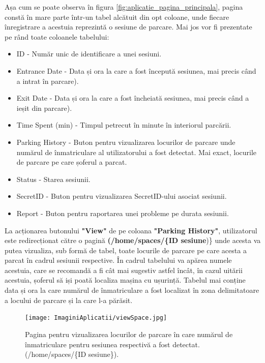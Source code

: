 \documentclass[12pt]{article}
\begin{document}
Așa cum se poate observa \^{i}n figura \ref{fig:aplicatie_pagina_principala}, pagina const\u{a} \^{i}n mare parte \^{i}ntr-un tabel alc\u{a}tuit din opt coloane, unde fiecare \^{i}nregistrare a acestuia reprezint\u{a} o sesiune de parcare. Mai jos vor fi prezentate pe r\^{a}nd toate coloanele tabelului:

\begin{itemize}
    \item ID - Num\u{a}r unic de identificare a unei sesiuni.
    \item Entrance Date - Data și ora la care a fost \^{i}nceput\u{a} sesiunea, mai precis c\^{a}nd a intrat \^{i}n parcare).
    \item Exit Date - Data și ora la care a fost \^{i}ncheiat\u{a} sesiunea, mai precis c\^{a}nd a ieșit din parcare).
    \item Time Spent (min) - Timpul petrecut \^{i}n minute \^{i}n interiorul parc\u{a}rii.
    \item Parking History - Buton pentru vizualizarea locurilor de parcare unde num\u{a}rul de \^{i}nmatriculare al utilizatorului a fost detectat. Mai exact, locurile de parcare pe care șoferul a parcat.
    \item Status - Starea sesiunii.
    \item SecretID - Buton pentru vizualizarea SecretID-ului asociat sesiunii.
    \item Report - Buton pentru raportarea unei probleme pe durata sesiunii.
\end{itemize}

La acționarea butonului \textbf{"View"} de pe coloana \textbf{"Parking History"}, utilizatorul este redirecționat c\u{a}tre o pagin\u{a} \textbf{(/home/spaces/\{ID sesiune})\} unde acesta va putea vizualiza, sub form\u{a} de tabel, toate locurile de parcare pe care acesta a parcat \^{i}n cadrul sesiunii respective. \^{I}n cadrul tabelului va ap\u{a}rea numele acestuia, care se recomand\u{a} a fi c\^{a}t mai sugestiv astfel \^{i}nc\^{a}t, \^{i}n cazul uit\u{a}rii acestuia, șoferul s\u{a} iși poat\u{a} localiza mașina cu ușurinț\u{a}. Tabelul mai conține data și ora la care num\u{a}rul de \^{i}nmatriculare a fost localizat \^{i}n zona delimitatoare a locului de parcare și la care l-a p\u{a}r\u{a}sit. 

\begin{figure}[H]
  \centering
  \texttt{[image: ImaginiAplicatii/viewSpace.jpg]}
  \caption{Pagina pentru vizualizarea locurilor de parcare \^{i}n care num\u{a}rul de \^{i}nmatriculare pentru sesiunea respectiv\u{a} a fost detectat. (/home/spaces/\{ID sesiune\}).}
  \label{fig:aplicatie_pagina_spaces}
\end{figure}
\end{document}
